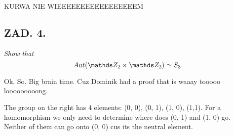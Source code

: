 \documentclass{article}[13pt]
\begin{document}
{\color{cyan}KURWA NIE WIEEEEEEEEEEEEEEEEEM}

\subsection*{ZAD. 4.}

\emph{Show that}
$$Aut(\Z_2\times\Z_2)\simeq S_3.$$

Ok. So. Big brain time. Cuz Dominik had a proof that is waaay tooooo looooooooong.
\medskip

The group on the right has $4$ elements: (0, 0), (0, 1), (1, 0), (1,1). For a homomorphism we only need to determine where does (0, 1) and (1, 0) go. Neither of them can go onto (0, 0) cus its the neutral element. 
\end{document}
